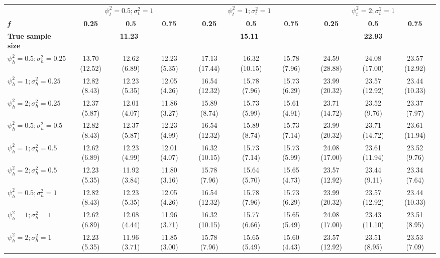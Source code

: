 \begin{table}[ht!]
{\begin{tabular}{l c c c c c c c c c}
\hline 
 & \multicolumn{3}{c}{$\psi_t^2 = 0.5; \sigma_t^2 = 1$} & \multicolumn{3}{c}{$\psi_t^2 = 1; \sigma_t^2 = 1$} & \multicolumn{3}{c}{$\psi_t^2 = 2; \sigma_t^2 = 1$} \\
\cline{2-10}
\textbf{\textit{f}} & \textbf{0.25} & \textbf{0.5} & \textbf{0.75} & \textbf{0.25} & \textbf{0.5} & \textbf{0.75} & \textbf{0.25} & \textbf{0.5} & \textbf{0.75} \\
\hline
\textbf{True sample size} & \multicolumn{3}{c}{\textbf{11.23}} & \multicolumn{3}{c}{\textbf{15.11}} & \multicolumn{3}{c}{\textbf{22.93}} \\
$\psi_h^2 = 0.5; \sigma_h^2 = 0.25$ & 13.70 (12.52) & 12.62 (6.89) & 12.23 (5.35) & 17.13 (17.44) & 16.32 (10.15) & 15.78 (7.96) & 24.59 (28.88) & 24.08 (17.00) & 23.57 (12.92) \\
$\psi_h^2 = 1; \sigma_h^2 = 0.25$ & 12.82 (8.43) & 12.23 (5.35) & 12.05 (4.26) & 16.54 (12.32) & 15.78 (7.96) & 15.73 (6.29) & 23.99 (20.32) & 23.57 (12.92) & 23.44 (10.33) \\
$\psi_h^2 = 2; \sigma_h^2 = 0.25$ & 12.37 (5.87) & 12.01 (4.07) & 11.86 (3.27) & 15.89 (8.74) & 15.73 (5.99) & 15.61 (4.91) & 23.71 (14.72) & 23.52 (9.76) & 23.37 (7.97) \\
$\psi_h^2 = 0.5; \sigma_h^2 = 0.5$ & 12.82 (8.43) & 12.37 (5.87) & 12.23 (4.99) & 16.54 (12.32) & 15.89 (8.74) & 15.73 (7.14) & 23.99 (20.32) & 23.71 (14.72) & 23.61 (11.94) \\
$\psi_h^2 = 1; \sigma_h^2 = 0.5$ & 12.62 (6.89) & 12.23 (4.99) & 12.01 (4.07) & 16.32 (10.15) & 15.73 (7.14) & 15.73 (5.99) & 24.08 (17.00) & 23.61 (11.94) & 23.52 (9.76) \\
$\psi_h^2 = 2; \sigma_h^2 = 0.5$ & 12.23 (5.35) & 11.92 (3.84) & 11.80 (3.16) & 15.78 (7.96) & 15.64 (5.70) & 15.65 (4.73) & 23.57 (12.92) & 23.44 (9.11) & 23.34 (7.64) \\
$\psi_h^2 = 0.5; \sigma_h^2 = 1$ & 12.82 (8.43) & 12.23 (5.35) & 12.05 (4.26) & 16.54 (12.32) & 15.78 (7.96) & 15.73 (6.29) & 23.99 (20.32) & 23.57 (12.92) & 23.44 (10.33) \\
$\psi_h^2 = 1; \sigma_h^2 = 1$ & 12.62 (6.89) & 12.08 (4.44) & 11.96 (3.71) & 16.32 (10.15) & 15.77 (6.66) & 15.65 (5.49) & 24.08 (17.00) & 23.43 (11.10) & 23.51 (8.95) \\
$\psi_h^2 = 2; \sigma_h^2 = 1$ & 12.23 (5.35) & 11.96 (3.71) & 11.85 (3.00) & 15.78 (7.96) & 15.65 (5.49) & 15.60 (4.43) & 23.57 (12.92) &  23.51 (8.95) & 23.53 (7.09) \\
\bottomrule
\end{tabular}}
\end{table}


